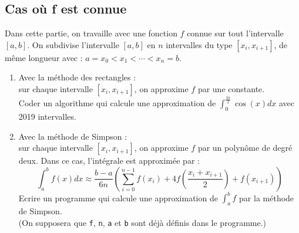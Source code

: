\subsection{Cas où f est connue}
Dans cette partie, on travaille avec une fonction $f$ connue sur tout l'intervalle $[a,b]$.
On subdivise l'intervalle $[a,b]$ en $n$ intervalles du type $[x_i,x_{i+1}]$, de même longueur avec  : $a=x_0<x_1<\cdots <x_n=b$.
\begin{enumerate}
\item Avec la méthode des rectangles : \\
sur chaque intervalle $[x_i,x_{i+1}]$, on approxime $f$ par une constante. \\
Coder un algorithme qui calcule une approximation de $\displaystyle\int_0^{\frac{3\pi}{2}}\cos(x)dx$ avec 2019 intervalles.
\item Avec la méthode de Simpson : \\
sur chaque intervalle $[x_i,x_{i+1}]$, on approxime $f$ par un polynôme de degré deux. Dans ce cas, l'intégrale est approximée par :
\[    {\displaystyle   \int_a^b f(x)dx\approx\frac {b-a}{6n}\left(\sum_{i=0}^{n-1} f(x_i)+4f\left( \frac{x_i+x_{i+1}}{2}\right)+f(x_{i+1}) \right)}\]
Ecrire un programme qui calcule une approximation de $\displaystyle   \int_a^b f$ par la méthode de Simpson.\\ 
(On supposera que \verb?f?, \verb?n?, \verb?a? et \verb?b? sont déjà définis dans le programme.)
\end{enumerate}
